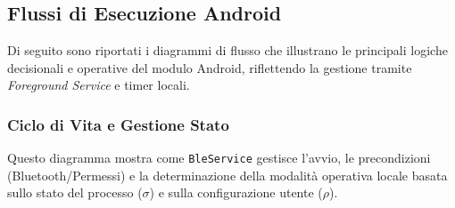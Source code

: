 \documentclass[a4paper,11pt,table,dvipsnames]{article}
\begin{document}
\subsection{Flussi di Esecuzione Android}
Di seguito sono riportati i diagrammi di flusso che illustrano le principali logiche decisionali e operative del modulo Android, riflettendo la gestione tramite \emph{Foreground Service} e timer locali.

\subsubsection{Ciclo di Vita e Gestione Stato}
Questo diagramma mostra come \texttt{BleService} gestisce l'avvio, le precondizioni (Bluetooth/Permessi) e la determinazione della modalità operativa locale basata sullo stato del processo (\(\sigma\)) e sulla configurazione utente (\(\rho\)).
\end{document}

